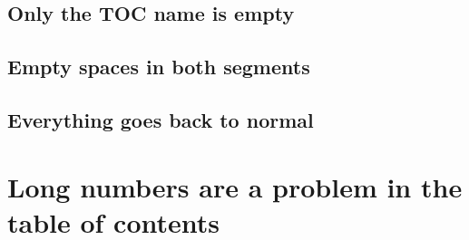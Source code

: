 \documentclass{homework}
\begin{document}
\lipsum[16]

\subsection[zz|]{Only the TOC name is empty}

\lipsum[17]

\subsection[ | ]{Empty spaces in both segments}

\lipsum[18]

\subsection{Everything goes back to normal}

\lipsum[19]

\section[2011|]{Long numbers are a problem in the table of contents}
\end{document}
